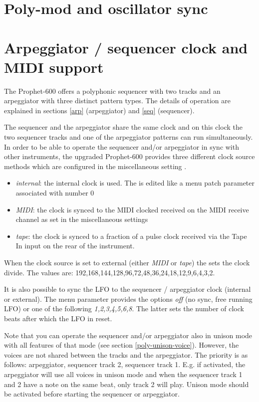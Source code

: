 \documentclass[landscape, 11pt, oneside, twoside]{report}
\newenvironment{flowtext}{\addmargin[0cm]{0cm}}{\endaddmargin} %
\begin{document}
\begin{flowtext}


\section{Poly-mod and oscillator sync}\label{polymod}



\pagebreak

\section{Arpeggiator / sequencer clock and MIDI support}\label{sync}

The Prophet-600 offers a polyphonic sequencer with two tracks and an arpeggiator with three distinct pattern types. The details of operation are explained in sections \ref{arp} (arpeggiator) and \ref{seq} (sequencer).

The sequencer and the arpeggiator share the same clock and on this clock the two sequencer tracks and one of the arpeggiator patterns can run simultaneously. In order to be able to operate the sequencer and/or arpeggiator in sync with other instruments, the upgraded Prophet-600 provides three different clock source methods which are configured in the miscellaneous setting \clocksync.
\begin{itemize}
  \item \textit{internal}: the internal clock is used. The \clock is edited like a menu patch parameter associated with number 0
  \item \textit{MIDI}: the clock is synced to the MIDI clocked received on the MIDI receive channel as set in the  miscellaneous settings
  \item \textit{tape}: the clock is synced to a fraction of a pulse clock received via the Tape In input on the rear of the instrument. 
\end{itemize}  
When the clock source is set to external (either \textit{MIDI} or \textit{tape}) the \clock sets the clock divide. The values are: 192,168,144,128,96,72,48,36,24,18,12,9,6,4,3,2.

It is also possible to sync the LFO to the sequencer / arpeggiator clock (internal or external). The menu parameter \lfosync provides the options \textit{off} (no sync, free running LFO) or one of the following \textit{1,2,3,4,5,6,8}. The latter sets the number of clock beats after which the LFO in reset.

Note that you can operate the sequencer and/or arpeggiator also in unison mode with all features of that mode (see section \ref{poly-unison-voice}). However, the voices are not shared between the tracks and the arpeggiator. The priority is as follows: arpeggiator, sequencer track 2, sequencer track 1. E.g. if activated, the arpeggiator will use all voices in unison mode and when the sequencer track 1 and 2 have a note on the same beat, only track 2 will play. Unison mode should be activated before starting the sequencer or arpeggiator.


\end{flowtext}
\end{document}

